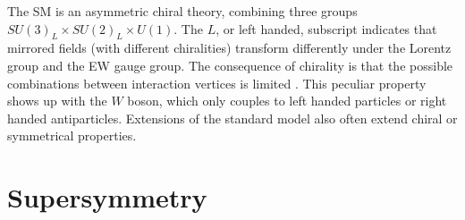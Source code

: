 





The SM is an asymmetric chiral theory, combining three groups $SU(3)_L \times SU(2)_L \times U(1)$. The $L$, or left handed, subscript indicates that mirrored fields (with different chiralities)  transform differently under the Lorentz group and the EW gauge group.  The consequence of chirality is that the possible combinations between interaction vertices is limited \cite{Thomson:2013zua}. This peculiar property shows up with the $W$ boson, which only couples to left handed particles or right handed antiparticles. Extensions of the standard model also often extend chiral or symmetrical properties.  %

\section{Supersymmetry}

